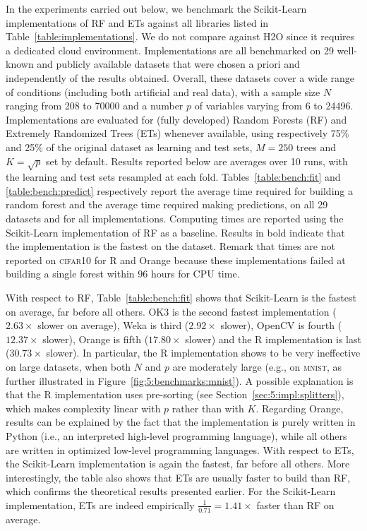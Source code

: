 In the experiments carried out below, we benchmark the Scikit-Learn
implementations of RF and ETs against all libraries listed in
Table~\ref{table:implementations}. We do not compare against H2O since it
requires a dedicated cloud environment. Implementations are all benchmarked on
29 well-known and publicly available datasets that were chosen a priori and
independently of the results obtained. Overall, these datasets cover a wide
range of conditions (including both artificial and real data), with a sample
size $N$ ranging from 208 to 70000 and a number $p$ of variables varying from 6
to 24496. Implementations are evaluated for (fully developed) Random Forests
(RF) and Extremely Randomized Trees (ETs) whenever available, using
respectively 75\% and 25\% of the original dataset as learning and test sets,
$M=250$ trees and $K=\sqrt{p}$ set by default. Results reported below are
averages over 10 runs, with the learning and test sets resampled at each fold.
Tables~\ref{table:bench:fit} and \ref{table:bench:predict} respectively report
the average time required for building a random forest and the average time
required making predictions, on all 29 datasets and for all implementations.
Computing times are reported using the Scikit-Learn implementation of RF as a
baseline. Results in bold indicate that the implementation is the fastest on
the dataset. Remark that times are not reported on \textsc{cifar10} for R and
Orange because these implementations failed at building a single forest within
$96$ hours for CPU time.

With respect to RF, Table~\ref{table:bench:fit} shows that Scikit-Learn is the
fastest on average, far before all others. OK3 is the second fastest
implementation ($2.63\times$ slower on average), Weka is third ($2.92\times$
slower), OpenCV is fourth ($12.37\times$ slower),  Orange is fifth
($17.80\times$ slower) and the R implementation is last ($30.73\times$ slower).
In particular, the R implementation shows to be very ineffective on large
datasets, when both $N$ and $p$ are moderately large (e.g., on \textsc{mnist},
as further illustrated in Figure~\ref{fig:5:benchmarks:mnist}). A possible explanation
is that the R implementation uses pre-sorting (see Section~\ref{sec:5:impl:splitters}), which makes complexity linear
with $p$ rather than with $K$. Regarding Orange, results can be explained by
the fact that the implementation is purely written in Python (i.e., an
interpreted high-level programming language), while all others are written in
optimized low-level programming languages. With respect to ETs, the
Scikit-Learn implementation is again the fastest, far before all others. More
interestingly, the table also shows that ETs are usually faster to build than RF,
which  confirms the theoretical results presented earlier. For the
Scikit-Learn implementation, ETs are indeed empirically $\tfrac{1}{0.71} = 1.41\times$
faster than RF on average.

